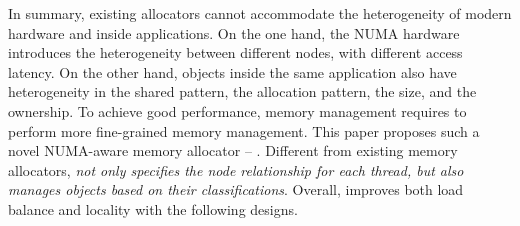 
In summary, existing allocators cannot accommodate the heterogeneity of modern hardware and inside applications. 
On the one hand, the NUMA hardware introduces the heterogeneity between different nodes, with different access latency. On the other hand, objects inside the same application also have heterogeneity in the shared pattern, the allocation pattern, the size, and the ownership. 
To achieve good performance, memory management requires to perform more fine-grained memory management. This paper proposes such a novel NUMA-aware memory allocator -- \NM{}. Different from existing memory allocators, \NM{} \textit{not only specifies the node relationship for each thread, but also manages objects based on their classifications}. Overall, \NM{} improves both load balance and locality with the following designs.  


